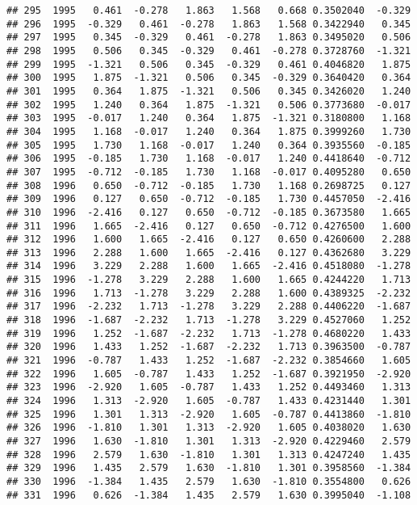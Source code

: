 \documentclass[]{article}
\begin{document}
\begin{verbatim}
## 295  1995   0.461  -0.278   1.863   1.568   0.668 0.3502040  -0.329
## 296  1995  -0.329   0.461  -0.278   1.863   1.568 0.3422940   0.345
## 297  1995   0.345  -0.329   0.461  -0.278   1.863 0.3495020   0.506
## 298  1995   0.506   0.345  -0.329   0.461  -0.278 0.3728760  -1.321
## 299  1995  -1.321   0.506   0.345  -0.329   0.461 0.4046820   1.875
## 300  1995   1.875  -1.321   0.506   0.345  -0.329 0.3640420   0.364
## 301  1995   0.364   1.875  -1.321   0.506   0.345 0.3426020   1.240
## 302  1995   1.240   0.364   1.875  -1.321   0.506 0.3773680  -0.017
## 303  1995  -0.017   1.240   0.364   1.875  -1.321 0.3180800   1.168
## 304  1995   1.168  -0.017   1.240   0.364   1.875 0.3999260   1.730
## 305  1995   1.730   1.168  -0.017   1.240   0.364 0.3935560  -0.185
## 306  1995  -0.185   1.730   1.168  -0.017   1.240 0.4418640  -0.712
## 307  1995  -0.712  -0.185   1.730   1.168  -0.017 0.4095280   0.650
## 308  1996   0.650  -0.712  -0.185   1.730   1.168 0.2698725   0.127
## 309  1996   0.127   0.650  -0.712  -0.185   1.730 0.4457050  -2.416
## 310  1996  -2.416   0.127   0.650  -0.712  -0.185 0.3673580   1.665
## 311  1996   1.665  -2.416   0.127   0.650  -0.712 0.4276500   1.600
## 312  1996   1.600   1.665  -2.416   0.127   0.650 0.4260600   2.288
## 313  1996   2.288   1.600   1.665  -2.416   0.127 0.4362680   3.229
## 314  1996   3.229   2.288   1.600   1.665  -2.416 0.4518080  -1.278
## 315  1996  -1.278   3.229   2.288   1.600   1.665 0.4244220   1.713
## 316  1996   1.713  -1.278   3.229   2.288   1.600 0.4389325  -2.232
## 317  1996  -2.232   1.713  -1.278   3.229   2.288 0.4406220  -1.687
## 318  1996  -1.687  -2.232   1.713  -1.278   3.229 0.4527060   1.252
## 319  1996   1.252  -1.687  -2.232   1.713  -1.278 0.4680220   1.433
## 320  1996   1.433   1.252  -1.687  -2.232   1.713 0.3963500  -0.787
## 321  1996  -0.787   1.433   1.252  -1.687  -2.232 0.3854660   1.605
## 322  1996   1.605  -0.787   1.433   1.252  -1.687 0.3921950  -2.920
## 323  1996  -2.920   1.605  -0.787   1.433   1.252 0.4493460   1.313
## 324  1996   1.313  -2.920   1.605  -0.787   1.433 0.4231440   1.301
## 325  1996   1.301   1.313  -2.920   1.605  -0.787 0.4413860  -1.810
## 326  1996  -1.810   1.301   1.313  -2.920   1.605 0.4038020   1.630
## 327  1996   1.630  -1.810   1.301   1.313  -2.920 0.4229460   2.579
## 328  1996   2.579   1.630  -1.810   1.301   1.313 0.4247240   1.435
## 329  1996   1.435   2.579   1.630  -1.810   1.301 0.3958560  -1.384
## 330  1996  -1.384   1.435   2.579   1.630  -1.810 0.3554800   0.626
## 331  1996   0.626  -1.384   1.435   2.579   1.630 0.3995040  -1.108

\end{verbatim}
\end{document}
